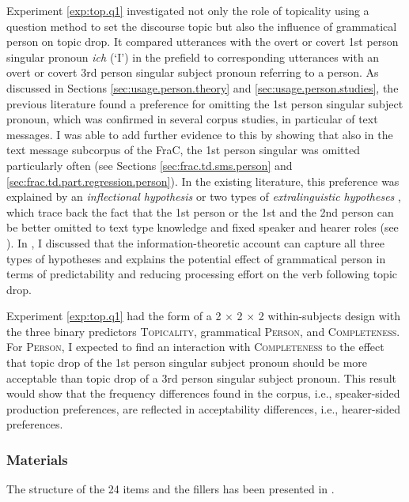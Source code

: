 Experiment \ref*{exp:top.q1} investigated not only the role of topicality using a question method to set the discourse topic but also the influence of grammatical person on topic drop.
It compared utterances with the overt or covert 1st person singular pronoun \textit{ich} (`I') in the prefield to corresponding utterances with an overt or covert 3rd person singular subject pronoun referring to a person.
As discussed in Sections \ref{sec:usage.person.theory} and \ref{sec:usage.person.studies}, the previous literature found a preference for omitting the 1st person singular subject pronoun, which was confirmed in several corpus studies, in particular of text messages. 
I was able to add further evidence to this by showing that also in the text message subcorpus of the FraC, the 1st person singular was omitted particularly often (see Sections \ref{sec:frac.td.sms.person} and \ref{sec:frac.td.part.regression.person}).
In the existing literature, this preference was explained by an \textit{inflectional hypothesis} \citep{auer1993} or two types of \textit{extralinguistic hypotheses} \citep[e.g.,][]{zifonun.etal1997,volodina.onea2012}, which trace back the fact that the 1st person or the 1st and the 2nd person can be better omitted to text type knowledge and fixed speaker and hearer roles (see ).
In , I discussed that the information-theoretic account can capture all three types of hypotheses and explains the potential effect of grammatical person in terms of predictability and reducing processing effort  on the verb following topic drop.

Experiment \ref*{exp:top.q1} had the form of a 2 $\times$ 2 $\times$ 2 within-subjects design with the three binary predictors \textsc{Topicality}, grammatical \textsc{Person}, and \textsc{Completeness}.
For \textsc{Person}, I expected to find an interaction with \textsc{Completeness} to the effect that topic drop of the 1st person singular subject pronoun should be more acceptable than topic drop of a 3rd person singular subject pronoun.
This result would show that the frequency differences found in the corpus, i.e., speaker-sided production preferences, are reflected in acceptability differences, i.e., hearer-sided preferences.

\subsubsection{Materials}
The structure of the 24 items and the fillers has been presented in .


